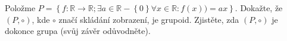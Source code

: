 \subsubsection{}
Položme $P=\left \{f:\mathbb{R}\rightarrow \mathbb{R}; \exists a
\in\mathbb{R}-\left \{ 0 \right \} \forall x \in \mathbb{R} : f(x)) = ax\right
\}$. Dokažte, že $(P,\circ)$, kde $\circ$ značí skládání zobrazení, je grupoid.
Zjistěte, zda $(P,\circ)$ je dokonce grupa (svůj závěr odůvodněte).
